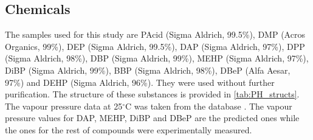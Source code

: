 \subsection{Chemicals}
The samples used for this study  are
%
%
PAcid (Sigma Aldrich, 99.5\%),                              %
DMP (Acros Organics, 99\%),                     %
DEP (Sigma Aldrich, 99.5\%),                     %
DAP (Sigma Aldrich, 97\%),                       %
DPP (Sigma Aldrich, 98\%),                      %
DBP (Sigma Aldrich, 99\%),                       %
MEHP (Sigma Aldrich, 97\%),               %
DiBP (Sigma Aldrich, 99\%),                   %
BBP (Sigma Aldrich, 98\%),                  %
DBeP (Alfa Aesar, 97\%)                         %
and
DEHP (Sigma Aldrich, 96\%). %
%
%
%
%
%
%
%
%
They were used without further purification.
%
The structure of these substances is provided in \autoref{tab:PH_structs}.
%
The vapour pressure data at 25$^\circ$C was taken from the \citeauthor{USAEPA} database \cite{USAEPA}. The vapour pressure values for DAP, MEHP, DiBP and DBeP are the predicted ones while the ones for the rest of compounds were experimentally measured.



